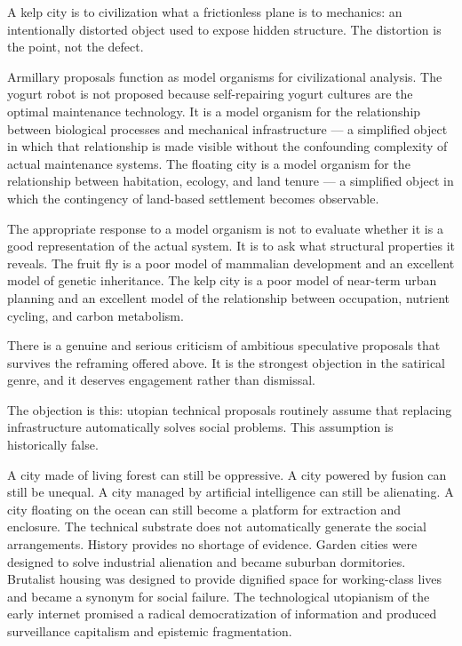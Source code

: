 \documentclass[12pt, a4paper]{article}
\theoremstyle{named}
\begin{document}
\begin{keybox}
A kelp city is to civilization what a frictionless plane is to
mechanics: an intentionally distorted object used to expose hidden
structure. The distortion is the point, not the defect.
\end{keybox}

Armillary proposals function as model organisms for civilizational
analysis. The yogurt robot is not proposed because self-repairing
yogurt cultures are the optimal maintenance technology. It is a model
organism for the relationship between biological processes and
mechanical infrastructure — a simplified object in which that
relationship is made visible without the confounding complexity of
actual maintenance systems. The floating city is a model organism for
the relationship between habitation, ecology, and land tenure — a
simplified object in which the contingency of land-based settlement
becomes observable.

The appropriate response to a model organism is not to evaluate whether
it is a good representation of the actual system. It is to ask what
structural properties it reveals. The fruit fly is a poor model of
mammalian development and an excellent model of genetic inheritance.
The kelp city is a poor model of near-term urban planning and an
excellent model of the relationship between occupation, nutrient cycling,
and carbon metabolism.



There is a genuine and serious criticism of ambitious speculative
proposals that survives the reframing offered above. It is the strongest
objection in the satirical genre, and it deserves engagement rather than
dismissal.

The objection is this: utopian technical proposals routinely assume that
replacing infrastructure automatically solves social problems. This
assumption is historically false.

A city made of living forest can still be oppressive. A city powered by
fusion can still be unequal. A city managed by artificial intelligence
can still be alienating. A city floating on the ocean can still become a
platform for extraction and enclosure. The technical substrate does not
automatically generate the social arrangements. History provides no
shortage of evidence. Garden cities were designed to solve industrial
alienation and became suburban dormitories. Brutalist housing was
designed to provide dignified space for working-class lives and became a
synonym for social failure. The technological utopianism of the early
internet promised a radical democratization of information and produced
surveillance capitalism and epistemic fragmentation.
\end{document}
